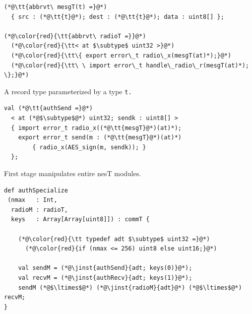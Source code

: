 
\begin{lstlisting}[language=nesC]
(*@\tt{abbrvt\ mesgT(t) =}@*)
  { src : (*@\tt{t}@*); dest : (*@\tt{t}@*); data : uint8[] };

(*@\color{red}{\tt{abbrvt\ radioT =}}@*)
  (*@\color{red}{\tt< at $\subtype$ uint32 >}@*)
  (*@\color{red}{\tt\{ export error\_t radio\_x(mesgT(at)*);}@*)
  (*@\color{red}{\tt\ \ import error\_t handle\_radio\_r(mesgT(at)*); \};}@*)
\end{lstlisting}

\begin{citemize}
\item A record type parameterized by a type \tt{t}.
\item \color{red}{nesT modules parameterized by types and values.}
\end{citemize}
\stopslide


\begin{lstlisting}[language=nesC]
val (*@\tt{authSend =}@*)
  < at (*@$\subtype$@*) uint32; sendk : uint8[] >  
  { import error_t radio_x((*@\tt{mesgT}@*)(at)*);
    export error_t send(m : (*@\tt{mesgT}@*)(at)*) 
        { radio_x(AES_sign(m, sendk)); }
  };
\end{lstlisting}

\begin{citemize}
\item First stage manipulates entire nesT modules.
\end{citemize}
\stopslide


\begin{lstlisting}[language=scalaness]
def authSpecialize
 (nmax   : Int,
  radioM : radioT,
  keys   : Array[Array[uint8]]) : commT {

    (*@\color{red}{\tt typedef adt $\subtype$ uint32 =}@*)
      (*@\color{red}{if (nmax <= 256) uint8 else uint16;}@*)

    val sendM = (*@\jinst{authSend}{adt; keys(0)}@*);
    val recvM = (*@\jinst{authRecv}{adt; keys(1)}@*);
    sendM (*@$\ltimes$@*) (*@\jinst{radioM}{adt}@*) (*@$\ltimes$@*) recvM;
}
\end{lstlisting}


